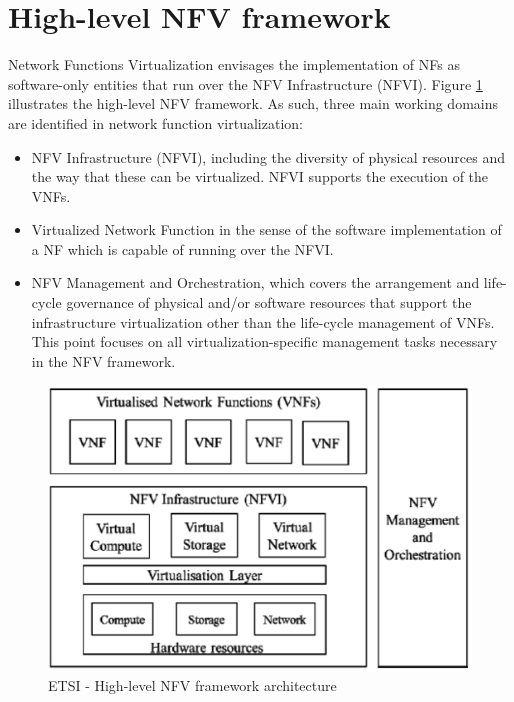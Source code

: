 \section{High-level NFV framework}
Network Functions Virtualization envisages the implementation of NFs as software-only entities that run over the NFV Infrastructure (NFVI). Figure \ref{fig:etsi_hl_nfv_framework} illustrates the high-level NFV framework. As such, three main working domains are identified in network function virtualization:
\begin{itemize}
	\item NFV Infrastructure (NFVI), including the diversity of physical resources and the way that these can be virtualized. NFVI supports the execution of the VNFs.

	\item Virtualized Network Function in the sense of the software implementation of a NF which is capable of running over the NFVI.
	
	\item NFV Management and Orchestration, which covers the arrangement and life-cycle governance of physical and/or software resources that support the infrastructure virtualization other than the life-cycle management of VNFs. This point focuses on all virtualization-specific management tasks necessary in the NFV framework.
\end{itemize}
\begin{figure}[h]
	\centering
	\includegraphics[clip= true, width= \columnwidth]{images/ETSI_Architectural_framework.png}
	\caption{ETSI - High-level NFV framework architecture}
	\label{fig:etsi_hl_nfv_framework}
\end{figure}

